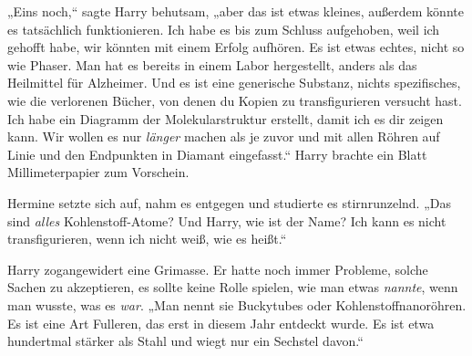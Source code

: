 „Eins noch,“ sagte Harry behutsam, „aber das ist etwas kleines, außerdem könnte es tatsächlich funktionieren. Ich habe es bis zum Schluss aufgehoben, weil ich gehofft habe, wir könnten mit einem Erfolg aufhören. Es ist etwas echtes, nicht so wie Phaser. Man hat es bereits in einem Labor hergestellt, anders als das Heilmittel für Alzheimer. Und es ist eine generische Substanz, nichts spezifisches, wie die verlorenen Bücher, von denen du Kopien zu transfigurieren versucht hast. Ich habe ein Diagramm der Molekularstruktur erstellt, damit ich es dir zeigen kann. Wir wollen es nur \emph{länger} machen als je zuvor und mit allen Röhren auf Linie und den Endpunkten in Diamant eingefasst.“ Harry brachte ein Blatt Millimeterpapier zum Vorschein.

Hermine setzte sich auf, nahm es entgegen und studierte es stirnrunzelnd. „Das sind \emph{alles} Kohlenstoff-Atome? Und Harry, wie ist der Name? Ich kann es nicht transfigurieren, wenn ich nicht weiß, wie es heißt.“

Harry zogangewidert eine Grimasse. Er hatte noch immer Probleme, solche Sachen zu akzeptieren, es sollte keine Rolle spielen, wie man etwas \emph{nannte}, wenn man wusste, was es \emph{war}. „Man nennt sie Buckytubes oder Kohlenstoffnanoröhren. Es ist eine Art Fulleren, das erst in diesem Jahr entdeckt wurde. Es ist etwa hundertmal stärker als Stahl und wiegt nur ein Sechstel davon.“

